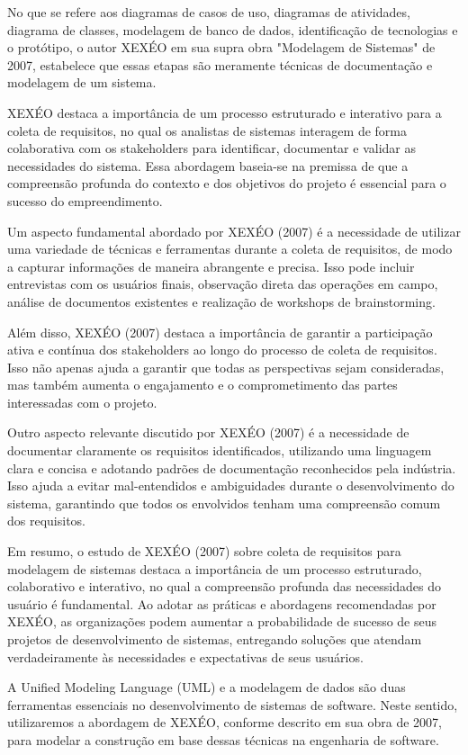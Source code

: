 \documentclass[12pt]{article}
\begin{document}
No que se refere aos diagramas de casos de uso, diagramas de atividades, diagrama de classes, modelagem de banco de dados, identificação de tecnologias e o protótipo, o autor XEXÉO em sua supra obra "Modelagem de Sistemas" de 2007, estabelece que essas etapas são meramente técnicas de documentação e modelagem de um sistema.

XEXÉO destaca a importância de um processo estruturado e interativo para a coleta de requisitos, no qual os analistas de sistemas interagem de forma colaborativa com os stakeholders para identificar, documentar e validar as necessidades do sistema. Essa abordagem baseia-se na premissa de que a compreensão profunda do contexto e dos objetivos do projeto é essencial para o sucesso do empreendimento.

Um aspecto fundamental abordado por XEXÉO (2007) é a necessidade de utilizar uma variedade de técnicas e ferramentas durante a coleta de requisitos, de modo a capturar informações de maneira abrangente e precisa. Isso pode incluir entrevistas com os usuários finais, observação direta das operações em campo, análise de documentos existentes e realização de workshops de brainstorming.

Além disso, XEXÉO (2007) destaca a importância de garantir a participação ativa e contínua dos stakeholders ao longo do processo de coleta de requisitos. Isso não apenas ajuda a garantir que todas as perspectivas sejam consideradas, mas também aumenta o engajamento e o comprometimento das partes interessadas com o projeto.

Outro aspecto relevante discutido por XEXÉO (2007) é a necessidade de documentar claramente os requisitos identificados, utilizando uma linguagem clara e concisa e adotando padrões de documentação reconhecidos pela indústria. Isso ajuda a evitar mal-entendidos e ambiguidades durante o desenvolvimento do sistema, garantindo que todos os envolvidos tenham uma compreensão comum dos requisitos.

Em resumo, o estudo de XEXÉO (2007) sobre coleta de requisitos para modelagem de sistemas destaca a importância de um processo estruturado, colaborativo e interativo, no qual a compreensão profunda das necessidades do usuário é fundamental. Ao adotar as práticas e abordagens recomendadas por XEXÉO, as organizações podem aumentar a probabilidade de sucesso de seus projetos de desenvolvimento de sistemas, entregando soluções que atendam verdadeiramente às necessidades e expectativas de seus usuários.

A Unified Modeling Language (UML) e a modelagem de dados são duas ferramentas essenciais no desenvolvimento de sistemas de software. Neste sentido, utilizaremos a abordagem de XEXÉO, conforme descrito em sua obra de 2007, para modelar a construção em base dessas técnicas na engenharia de software.
\end{document}
